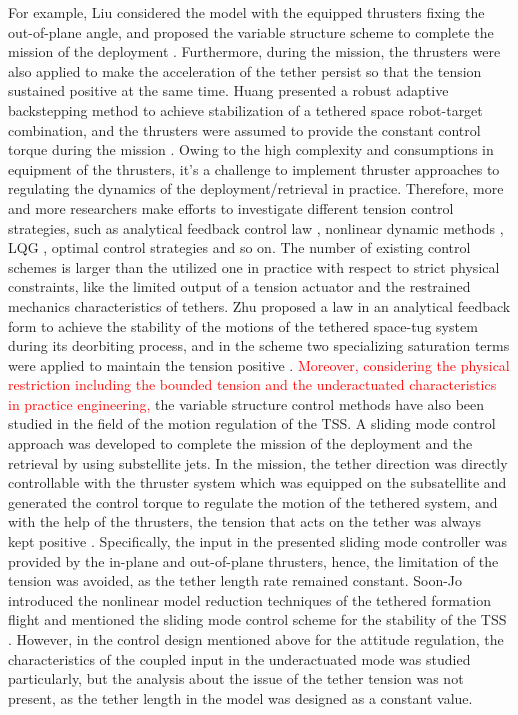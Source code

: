 \documentclass[3p]{elsarticle}
\theoremstyle{plain}
\begin{document}
For example, Liu considered the model with the equipped thrusters fixing the out-of-plane angle, and proposed the variable structure scheme to complete the mission of the deployment \cite{yingying2012variable}. Furthermore, during the mission, the thrusters were also applied to make the acceleration of the tether persist so that the tension sustained positive at the same time. Huang presented a robust adaptive backstepping method to achieve stabilization of a tethered space robot-target combination, and the thrusters were assumed to provide the constant control torque during the mission \cite{huang2015adaptive}. Owing to the high complexity and consumptions in equipment of the thrusters, it's a challenge to implement thruster approaches to regulating the dynamics of the deployment/retrieval in practice. Therefore, more and more researchers make efforts to investigate different tension control strategies, such as analytical feedback control law \cite{wen2015space}, nonlinear dynamic methods \cite{jung2015nonlinear}, LQG \cite{yousefian2015anti}, optimal control strategies \cite{steindl2015optimal,Williams2009745} and so on. The number of existing control schemes is larger than the utilized one in practice with respect to strict physical constraints, like the limited output of a tension actuator and the restrained mechanics characteristics of tethers. Zhu proposed a law in an analytical feedback form to achieve the stability of the motions of the tethered space-tug system during its deorbiting process, and in the scheme two specializing saturation terms were applied to maintain the tension positive \cite{wen2016constrained}. \textcolor{red}{Moreover, considering the physical restriction including the bounded tension and the underactuated characteristics in practice engineering,} the variable structure control methods have also been studied in the field of the motion regulation of the TSS. A sliding mode control approach was developed to complete the mission of the deployment and the retrieval by using substellite jets. In the mission, the tether direction was directly controllable with the thruster system which was equipped on the subsatellite and generated the control torque to regulate the motion of the tethered system, and with the help of the thrusters, the tension that acts on the tether was always kept positive \cite{yingying2012variable}.
Specifically, the input in the presented sliding mode controller was provided by the in-plane and out-of-plane thrusters, hence, the limitation of the tension was avoided, as the tether length rate remained constant. Soon-Jo introduced the nonlinear model reduction techniques of the tethered formation flight and mentioned the sliding mode control scheme for the stability of the TSS \cite{chung2007nonlinear,chung2008propellant2}. However, in the control design mentioned above for the attitude regulation, the characteristics of the coupled input in the underactuated mode was studied particularly, but the analysis about the issue of the tether tension was not present, as the tether length in the model was designed as a constant value.\par
\end{document}
